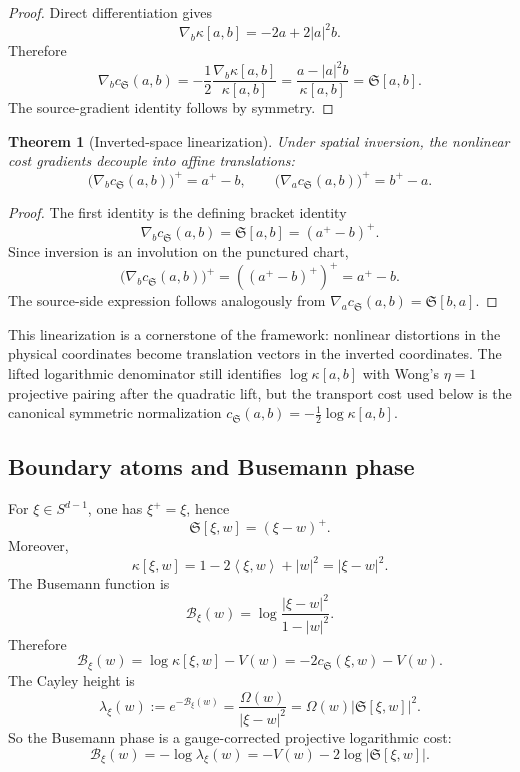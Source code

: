 \documentclass[11pt]{article}
\newtheorem{theorem}{Theorem}[section]
\newcommand{\Sph}{{S}}
\newcommand{\ip}[2]{\left\langle #1,#2\right\rangle}
\newcommand{\norm}[1]{\left|#1\right|}
\newcommand{\cs}{c_{\mathfrak S}}
\newcommand{\grad}{\nabla}
\newcommand{\Sbr}[2]{\mathfrak S[#1,#2]}
\newcommand{\kap}[2]{\kappa[#1,#2]}
\newcommand{\Om}{\Omega}
\newcommand{\calB}{\mathcal B}
\begin{document}
\begin{proof}
Direct differentiation gives
\[
    \grad_b\kap{a}{b}=-2a+2\norm a^2b.
\]
Therefore
\[
    \grad_b\cs(a,b)
    =-\frac12\frac{\grad_b\kap{a}{b}}{\kap{a}{b}}
    =\frac{a-\norm a^2b}{\kap{a}{b}}
    =\Sbr{a}{b}.
\]
The source-gradient identity follows by symmetry.
\end{proof}

\begin{theorem}[Inverted-space linearization]
Under spatial inversion, the nonlinear cost gradients decouple into affine translations:
\[
    \boxed{
    \bigl(\grad_b\cs(a,b)\bigr)^+=a^+-b,
    \qquad
    \bigl(\grad_a\cs(a,b)\bigr)^+=b^+-a.
    }
\]
\end{theorem}

\begin{proof}
The first identity is the defining bracket identity
\[
    \grad_b\cs(a,b)=\Sbr{a}{b}=(a^+-b)^+.
\]
Since inversion is an involution on the punctured chart,
\[
    \bigl(\grad_b\cs(a,b)\bigr)^+
    =\left((a^+-b)^+\right)^+
    =a^+-b.
\]
The source-side expression follows analogously from $\grad_a\cs(a,b)=\Sbr{b}{a}$.
\end{proof}

This linearization is a cornerstone of the framework: nonlinear distortions in the physical coordinates become translation vectors in the inverted coordinates.  The lifted logarithmic denominator still identifies $\log\kap{a}{b}$ with Wong's $\eta=1$ projective pairing after the quadratic lift, but the transport cost used below is the canonical symmetric normalization $\cs(a,b)=-\frac12\log\kap{a}{b}$.

\subsection{Boundary atoms and Busemann phase}

For $\xi\in\Sph^{d-1}$, one has $\xi^+=\xi$, hence
\[
    \Sbr{\xi}{w}=(\xi-w)^+.
\]
Moreover,
\[
    \kap{\xi}{w}=1-2\ip\xi w+\norm w^2=\norm{\xi-w}^2.
\]
The Busemann function is
\[
    \calB_\xi(w)=\log\frac{\norm{\xi-w}^2}{1-\norm w^2}.
\]
Therefore
\[
    \boxed{
    \calB_\xi(w)=\log\kap{\xi}{w}-V(w)=-2\cs(\xi,w)-V(w).
    }
\]
The Cayley height is
\[
    \lambda_\xi(w):=e^{-\calB_\xi(w)}=\frac{\Om(w)}{\norm{\xi-w}^2}
    =\Om(w)\norm{\Sbr{\xi}{w}}^2.
\]
So the Busemann phase is a gauge-corrected projective logarithmic cost:
\[
    \boxed{
    \calB_\xi(w)=-\log\lambda_\xi(w)=-V(w)-2\log\norm{\Sbr{\xi}{w}}.
    }
\]
\end{document}
